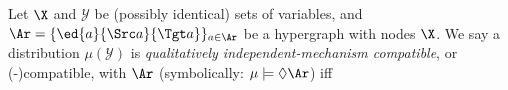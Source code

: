 \begin{defn}[\scibility]
        \label{defn:qim}
    Let $\X$ and $\mathcal Y$ be (possibly identical) sets of variables, and
    $\Ar = \{ \ed{a}{\Src a}{\Tgt a} \}_{a \in \Ar}$ be a hypergraph with 
    nodes $\X$.    
    We say a distribution $\mu(\mathcal Y)$ is
    \emph{%
        qualitatively
        independent-mechanism compatible}, or (\SQIM-)compatible,
    with $\Ar$
    (symbolically: $\mu \models \Diamond \Ar$)
    iff

\end{defn}
